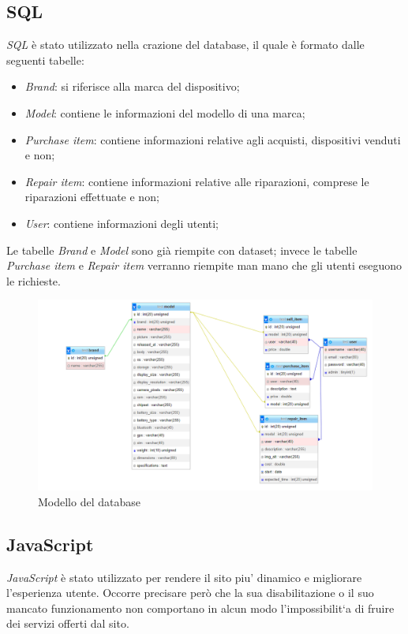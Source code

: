 \subsection{SQL}
\textit{SQL} è stato utilizzato nella crazione del database, il quale è formato dalle seguenti tabelle:

\begin{itemize}
	\item \textit{Brand}: si riferisce alla marca del dispositivo;
	\item \textit{Model}: contiene le informazioni del modello di una marca;
	\item \textit{Purchase item}: contiene informazioni relative agli acquisti, dispositivi venduti e non;
	\item \textit{Repair item}: contiene informazioni relative alle riparazioni, comprese le riparazioni effettuate e non;
	\item \textit{User}: contiene informazioni degli utenti;
\end{itemize}

Le tabelle \textit{Brand} e \textit{Model} sono già riempite con dataset; invece le tabelle \textit{Purchase item} e \textit{Repair item}
verranno riempite man mano che gli utenti eseguono le richieste.

\begin{figure}[H]
	\centering
	\includegraphics[scale=0.4]{res/database.png}
	\caption{Modello del database}
\end{figure}

\subsection{JavaScript}
\textit{JavaScript} è stato utilizzato per rendere il sito piu' dinamico e migliorare l’esperienza utente. Occorre
precisare però che la sua disabilitazione o il suo mancato funzionamento non comportano in alcun
modo l’impossibilit`a di fruire dei servizi offerti dal sito.

